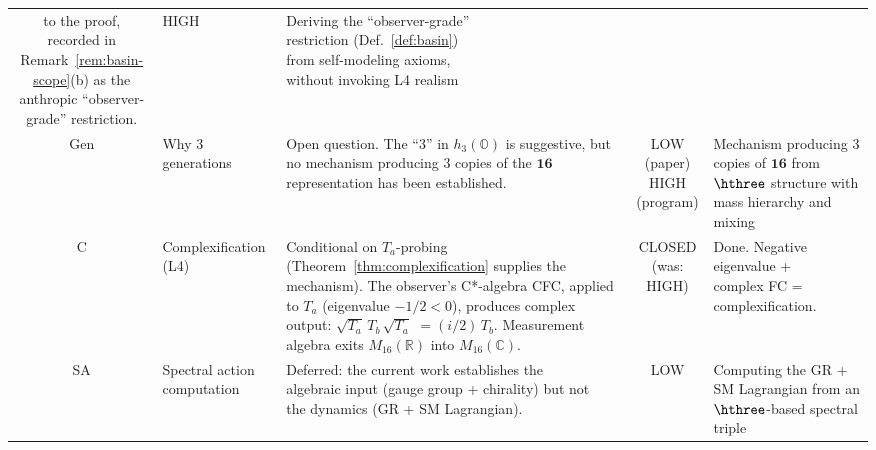 \begin{table}[t]
\begin{ruledtabular}
\begin{tabular}{cllcl}
{    to the proof, recorded in\\
    Remark~\ref{rem:basin-scope}(b) as the\\
    anthropic ``observer-grade'' restriction.}
  & HIGH
  & \makecell[l]{Deriving the ``observer-grade''\\
    restriction (Def.~\ref{def:basin})\\
    from self-modeling axioms,\\
    without invoking L4 realism} \\[4pt]
Gen
  & Why 3 generations
  & \makecell[l]{Open question. The ``3'' in $h_3(\mathbb{O})$ is suggestive,\\
    but no mechanism producing 3 copies of the $\mathbf{16}$\\
    representation has been established.}
  & \makecell[l]{LOW\\(paper)\\HIGH\\(program)}
  & \makecell[l]{Mechanism producing 3 copies\\
    of $\mathbf{16}$ from $\hthree$ structure\\
    with mass hierarchy and mixing} \\[4pt]
C
  & Complexification (L4)
  & \makecell[l]{Conditional on $T_a$-probing (Theorem~\ref{thm:complexification} supplies the mechanism).\\
    The observer's C*-algebra CFC, applied to $T_a$\\
    (eigenvalue $-1/2 < 0$), produces complex output:\\
    $\sqrt{T_a}\,T_b\,\sqrt{T_a}$\\
    $= (i/2)\,T_b$. Measurement algebra exits\\
    $M_{16}(\mathbb{R})$ into $M_{16}(\mathbb{C})$.}
  & \makecell[l]{CLOSED\\(was: HIGH)}
  & \makecell[l]{Done. Negative eigenvalue +\\
    complex FC = complexification.} \\[4pt]
SA
  & Spectral action computation
  & \makecell[l]{Deferred: the current work establishes the\\
    algebraic input (gauge group + chirality) but not\\
    the dynamics (GR + SM Lagrangian).}
  & LOW
  & \makecell[l]{Computing the GR + SM Lagrangian\\
    from an $\hthree$-based spectral triple} \\
\end{tabular}
\end{ruledtabular}
\end{table}

